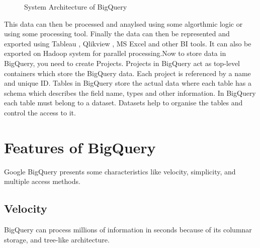 \documentclass[9pt,twocolumn,twoside]{../../styles/osajnl}
\begin{document}
\begin{figure}[htbp]
\centering
{}
\caption{\cite{www-bigquery-slideshare} System Architecture of
  BigQuery}
\label{fig:architecture}
\end{figure}

\noindent
This data can then be processed and anaylsed using some algorthmic
logic or using some processing tool. Finally the data can then be
represented and exported using Tableau \cite{www-tableau},
Qlikview \cite{www-qlik}, MS Excel \cite{www-excel} and other BI
tools. It can also be exported on Hadoop system for parallel
processing.\newline Now to store data in BigQuery, you need to create
Projects. Projects \cite{www-bigquery-documentation} in BigQuery act as
top-level containers which store the BigQuery data. Each project is
referenced by a name and unique ID. Tables in BigQuery store the
actual data where each table has a schema which describes the field
name, types and other information. In BigQuery each table must belong
to a dataset. Datasets help to organise the tables and control the
access to it.

\noindent

\section{Features of BigQuery}
Google BigQuery presents some characteristics like velocity,
simplicity, and multiple access methods.

\subsection{Velocity}

BigQuery can process millions of information in seconds because of its
columnar storage, and tree-like architecture.
\end{document}
